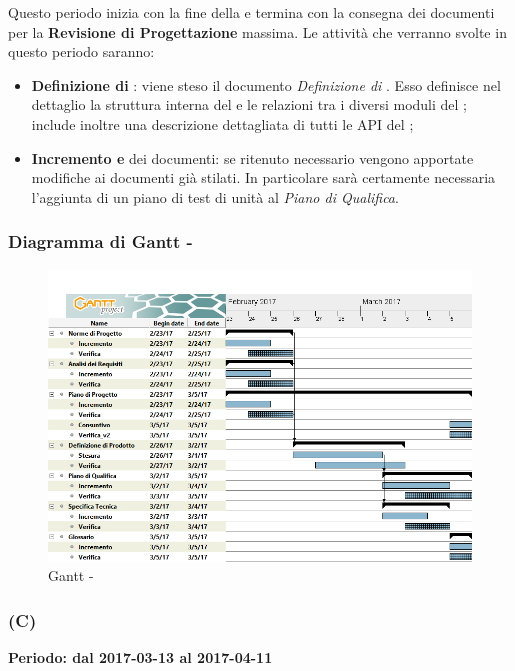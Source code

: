 \documentclass[./PianoDiProgetto.tex]{subfiles}
\begin{document}
  Questo periodo inizia con la fine della \PerPA{} e termina con la consegna dei documenti per la \textbf{Revisione di Progettazione} massima. Le attività che verranno svolte in questo periodo saranno:
  \begin{itemize}
    \item \textbf{Definizione di }: viene steso il documento \textit{Definizione di }. Esso definisce nel dettaglio la struttura interna del  e le relazioni tra i diversi moduli del ; include inoltre una descrizione dettagliata di tutti le API del ;
    \item \textbf{Incremento e } dei documenti: se ritenuto necessario vengono apportate modifiche ai documenti già stilati. In particolare sarà certamente necessaria l'aggiunta di un piano di test di unità al \textit{Piano di Qualifica}.
  \end{itemize}

  \newpage
  \subsubsection{Diagramma di Gantt - \PerPD}
    \begin{figure}[!h]
    \centering
    \includegraphics[width=\textwidth]{images/PD}
    \caption{Gantt - \PerPD}
    \end{figure}

  \subsubsection{\PerC{} (C)}
  \textbf{Periodo: dal 2017-03-13 al 2017-04-11}
\end{document}
